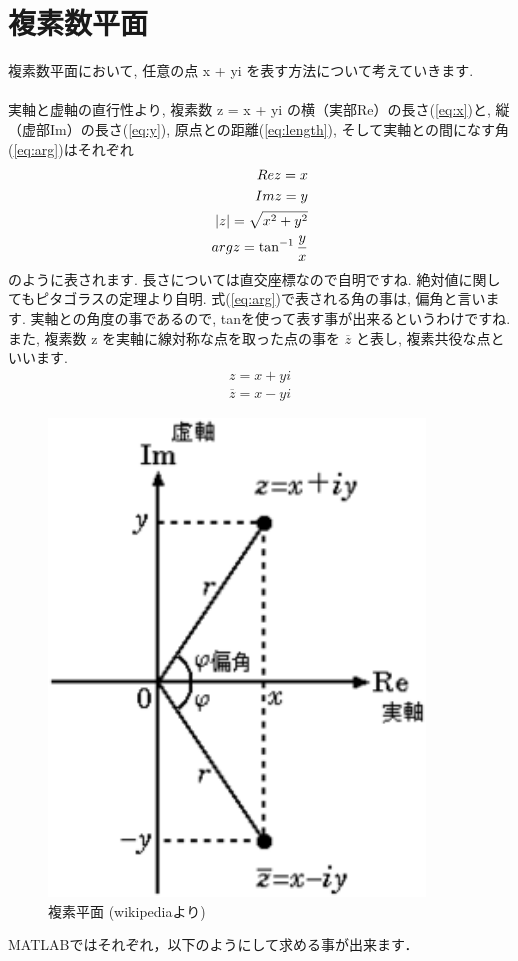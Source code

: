 \documentclass[11pt,a4paper]{jreport}
\begin{document}
\section{複素数平面}
複素数平面において, 任意の点 x + yi を表す方法について考えていきます. \\
\\
実軸と虚軸の直行性より, 複素数 z = x + yi の横（実部Re）の長さ(\ref{eq:x})と, 縦（虚部Im）の長さ(\ref{eq:y}), 原点との距離(\ref{eq:length}), そして実軸との間になす角(\ref{eq:arg})はそれぞれ
\begin{eqnarray}
\label{eq:vector}
\mathstrut Re z = x
\label{eq:x}
\\
\mathstrut Im z = y
\label{eq:y}
\\
|z| = \sqrt{x^2 + y^2}
\label{eq:length}\\
\mathstrut arg z = \tan^{-1} \frac{y}{x}
\label{eq:arg}
\end{eqnarray}
のように表されます. 長さについては直交座標なので自明ですね. 絶対値に関してもピタゴラスの定理より自明. 式(\ref{eq:arg})で表される角の事は, 偏角と言います. 実軸との角度の事であるので, tanを使って表す事が出来るというわけですね.\\

また, 複素数 z を実軸に線対称な点を取った点の事を $ \overline{z}$ と表し, 複素共役な点といいます.\\

\begin{eqnarray}
\label{eq:conj}
z = x + yi
\end{eqnarray}
\begin{eqnarray}
\overline{z} = x - yi
\end{eqnarray}

\begin{figure}[H]
\label{im:complex}
  \centering
  \includegraphics[width=100mm,bb=0 0 220 279]{../figures/Complex.png}
  \caption{複素平面 (wikipediaより)}
\end{figure}
MATLABではそれぞれ，以下のようにして求める事が出来ます．
\end{document}
